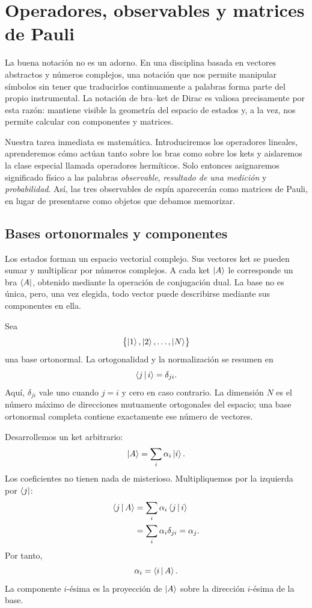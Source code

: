 \chapter{Operadores, observables y matrices de Pauli}

La buena notación no es un adorno. En una disciplina basada en vectores abstractos y números complejos, una notación que nos permite manipular símbolos sin tener que traducirlos continuamente a palabras forma parte del propio instrumental. La notación de bra--ket de Dirac es valiosa precisamente por esta razón: mantiene visible la geometría del espacio de estados y, a la vez, nos permite calcular con componentes y matrices.

Nuestra tarea inmediata es matemática. Introduciremos los operadores lineales, aprenderemos cómo actúan tanto sobre los bras como sobre los kets y aislaremos la clase especial llamada operadores hermíticos. Solo entonces asignaremos significado físico a las palabras \emph{observable}, \emph{resultado de una medición} y \emph{probabilidad}. Así, las tres observables de espín aparecerán como matrices de Pauli, en lugar de presentarse como objetos que debamos memorizar.

\section{Bases ortonormales y componentes}

Los estados forman un espacio vectorial complejo. Sus vectores ket se pueden sumar y multiplicar por números complejos. A cada ket \(\left\lvert A\right\rangle\) le corresponde un bra \(\left\langle A\right\rvert\), obtenido mediante la operación de conjugación dual. La base no es única, pero, una vez elegida, todo vector puede describirse mediante sus componentes en ella.

Sea
\[
\bigl\{\left\lvert1\right\rangle,\left\lvert2\right\rangle,\ldots,\left\lvert N\right\rangle\bigr\}
\]
una base ortonormal. La ortogonalidad y la normalización se resumen en
\begin{equation}
\left\langle j\,\middle|\,i\right\rangle=\delta_{ji}.
\label{eq:orthonormal-basis}
\end{equation}
Aquí, \(\delta_{ji}\) vale uno cuando \(j=i\) y cero en caso contrario. La dimensión \(N\) es el número máximo de direcciones mutuamente ortogonales del espacio; una base ortonormal completa contiene exactamente ese número de vectores.

Desarrollemos un ket arbitrario:
\begin{equation}
\left\lvert A\right\rangle=\sum_i \alpha_i\left\lvert i\right\rangle.
\label{eq:ket-expansion}
\end{equation}
Los coeficientes no tienen nada de misterioso. Multipliquemos por la izquierda por \(\left\langle j\right\rvert\):
\begin{align}
\left\langle j\,\middle|\,A\right\rangle
 &=\sum_i\alpha_i\left\langle j\,\middle|\,i\right\rangle \\
 &=\sum_i\alpha_i\delta_{ji}
 =\alpha_j.
\end{align}
Por tanto,
\begin{equation}
\alpha_i=\left\langle i\,\middle|\,A\right\rangle.
\label{eq:components-inner-products}
\end{equation}
La componente \(i\)-ésima es la proyección de \(\left\lvert A\right\rangle\) sobre la dirección \(i\)-ésima de la base.

